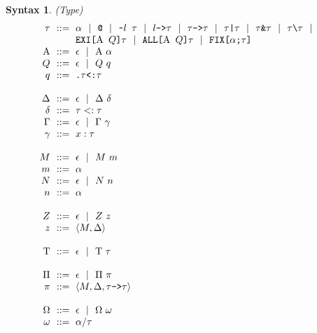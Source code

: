 \documentclass[acmsmall]{acmart}
\newtheorem{syntax}{Syntax}[section]
\begin{document}
\begin{syntax} (Type)
  \[\begin{array}[t]{r@{}l}
    \nonterm{\tau} & \is 
    \begin{array}[t]{@{}l}
      \code{$\alpha$} \sep 
      \code{@} \sep
      \code{\textasciitilde{}$l$ $\tau$} \sep 
      \code{$l$->$\tau$} \sep 
      \code{$\tau$->$\tau$} \sep
      \code{$\tau$|$\tau$} \sep
      \code{$\tau$\&$\tau$} \sep
      \code{$\tau$\textbackslash$\tau$} \sep 
      \\
      \code{EXI[$\mathrm{A}$ $Q$]$\tau$} \sep 
      \code{ALL[$\mathrm{A}$ $Q$]$\tau$} \sep 
      \code{FIX[$\alpha$;$\tau$]}
    \end{array}
    \\
    \nonterm{\mathrm{A}} & \is \epsilon \sep \mathrm{A}\ \alpha 
    \\
    \nonterm{Q} & \is \epsilon \sep Q\ q
    \\
    \nonterm{q} & \is \code{.$\tau$<:$\tau$} 
    \\
    \\
    \nonterm{\Delta} & \is \epsilon \sep \Delta\ \delta
    \\
    \nonterm{\delta} & \is \tau <: \tau 
    \\
    \nonterm{\Gamma} & \is \epsilon \sep \Gamma\ \gamma
    \\
    \nonterm{\gamma} & \is x : \tau
    \\
    \\
    \nonterm{M} & \is \epsilon \sep M\ m
    \\
    \nonterm{m} & \is \alpha
    \\
    \nonterm{N} & \is \epsilon \sep N\ n
    \\
    \nonterm{n} & \is \alpha
    \\
    \\
    \nonterm{Z} & \is \epsilon \sep Z\ z
    \\
    \nonterm{z} & \is \left< M, \Delta \right>
    \\
    \\
    \nonterm{\mathrm{T}} & \is \epsilon \sep \mathrm{T}\ \tau
    \\
    \\
    \nonterm{\mathrm{\Pi}} & \is \epsilon \sep \Pi\ \pi
    \\
    \nonterm{\pi} & \is \left< M, \Delta, \tau \code{->} \tau\right>
    \\
    \\
    \nonterm{\Omega} & \is \epsilon \sep \Omega\ \omega
    \\  
    \nonterm{\omega} & \is \alpha \slash \tau
  \end{array}\]
  \label{syntax:type}
\end{syntax}
\end{document}
